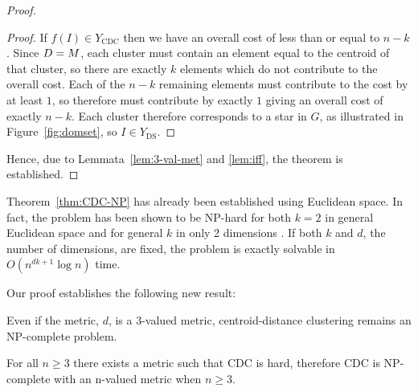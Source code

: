 \begin{proof}
\begin{proof}
    If $f(I) \in Y_{\text{CDC}}$ then we have an overall cost of less than or
    equal to $n-k$.  Since $D = M$, each cluster must contain an element
    equal to the centroid of that cluster, so there are exactly $k$ elements
    which do not contribute to the overall cost.  Each of the $n-k$ remaining
    elements must contribute to the cost by at least $1$, so therefore must
    contribute by exactly $1$ giving an overall cost of exactly $n-k$.  Each
    cluster therefore corresponds to a star in $G$, as illustrated in
    Figure~\ref{fig:domset}, so $I \in Y_{\text{DS}}$.
  \end{proof}

  Hence, due to Lemmata~\ref{lem:3-val-met} and \ref{lem:iff}, the theorem is
  established.
\end{proof}

Theorem~\ref{thm:CDC-NP} has already been established using Euclidean space.
In fact, the problem has been shown to be NP-hard for both $k=2$ in general
Euclidean space \citep{aloise09} and for general $k$ in only 2 dimensions
\citep{mahajan09}.  If both $k$ and $d$, the number of dimensions, are fixed,
the problem is exactly solvable in $O(n^{dk+1} \log n)$
time\citep{inaba94weightedvoronoi}.

Our proof establishes the following new result:
\begin{cor}
  Even if the metric, $d$, is a 3-valued metric, centroid-distance clustering
  remains an NP-complete problem.
\end{cor}

\begin{thm}
  \label{thm:cdc-np-complete-n-val}
  For all $n \geq 3$ there exists a metric such that CDC is hard, therefore
  CDC is NP-complete with an n-valued metric when $n \geq 3$.
\end{thm}

